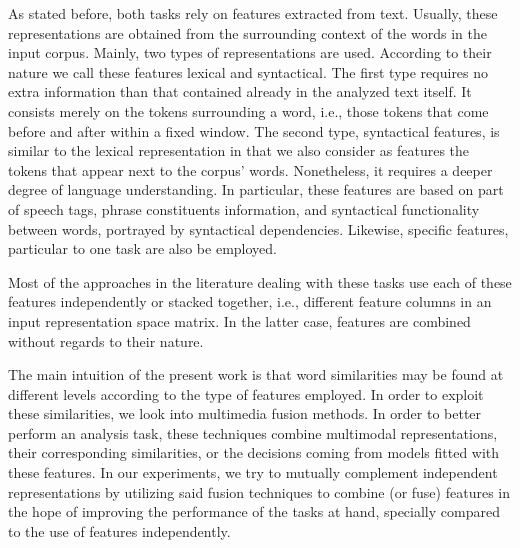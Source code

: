 As stated before, both tasks rely on features extracted from text. Usually, these representations are obtained from the surrounding context of the words in the  input corpus. Mainly,  two types of representations are used. According to their nature we call these features lexical and syntactical. 	The first type requires no extra information than that contained already in the analyzed text itself. It consists merely on the tokens surrounding a word, i.e., those tokens that come before and after within a fixed window. The second type, syntactical features, is similar to the lexical representation in that we also consider as features the tokens that appear next to the corpus' words. Nonetheless, it requires a deeper degree of language understanding. In particular, these features are based on part of speech tags, phrase constituents information, and syntactical functionality between words, portrayed by syntactical dependencies. Likewise, specific features, particular to one task are also be employed.



Most of the approaches in the literature dealing with these tasks use each of these features independently or stacked together, i.e., different feature columns in an input representation space matrix. In the latter case, features are combined without regards to their nature. 

The main intuition of the present work is that word similarities may be found at different levels according to the type of features employed. In order to exploit these similarities, we look into multimedia fusion methods.  In order to better perform an analysis task, these techniques combine multimodal representations, their corresponding similarities, or the decisions coming from models fitted with these features. In our experiments, we try to mutually complement independent representations by utilizing said fusion techniques to combine (or fuse) features in the hope of improving the performance of the tasks at hand, specially compared to the use of features independently. 

